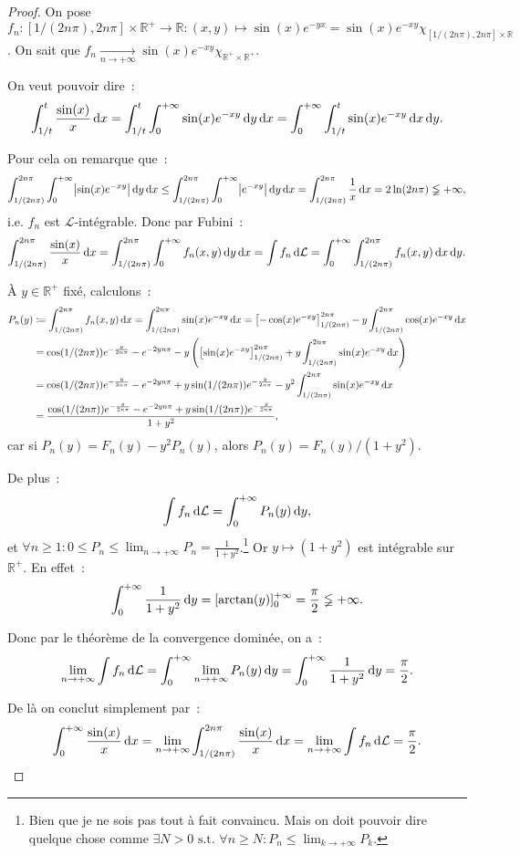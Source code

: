\documentclass{article}
\theoremstyle{definition}
\newcommand{\pinfty}{{+\infty}}
\newcommand{\st}{\text{ s.t. }}
\newcommand{\R}{{\mathbb R}}
\begin{document}
\begin{proof} On pose $f_n : [1/(2n\pi), 2n\pi] \times \R^+ \to \R : (x, y) \mapsto \sin(x)e^{-yx} = \sin(x)e^{-xy}\chi_{[1/(2n\pi), 2n\pi] \times \R}$. On sait que
$f_n \xrightarrow[n \to \pinfty]{} \sin(x)e^{-xy}\chi_{\R^+ \times \R^+}$.

On veut pouvoir dire~:
\[\int_{1/t}^t\frac {\sin(x)}x\dif x = \int_{1/t}^t\int_0^\pinfty\sin(x)e^{-xy}\dif y\dif x = \int_0^\pinfty\int_{1/t}^t\sin(x)e^{-xy}\dif x\dif y.\]

Pour cela on remarque que~:
\[\int_{1/(2n\pi)}^{2n\pi}\int_0^\pinfty\abs {\sin(x)e^{-xy}}\dif y\dif x \leq \int_{1/(2n\pi)}^{2n\pi}\int_0^\pinfty\abs {e^{-xy}}\dif y\dif x
	= \int_{1/(2n\pi)}^{2n\pi}\frac 1x\dif x = 2\ln (2n\pi) \lneqq \pinfty,\]
i.e. $f_n$ est $\mathcal L$-intégrable. Donc par Fubini~:
\[\int_{1/(2n\pi)}^{2n\pi}\frac {\sin(x)}x\dif x = \int_{1/(2n\pi)}^{2n\pi}\int_0^\pinfty f_n(x, y)\dif y\dif x = \int f_n\dif\mathcal L
	= \int_0^\pinfty\int_{1/(2n\pi)}^{2n\pi}f_n(x, y)\dif x\dif y.\]

À $y \in \R^+$ fixé, calculons~:
\begin{align*}
	P_n(y) &\coloneqq \int_{1/(2n\pi)}^{2n\pi}f_n(x, y)\dif x = \int_{1/(2n\pi)}^{2n\pi}\sin(x)e^{-xy}\dif x = \left[-\cos(x)e^{-xy}\right]_{1/(2n\pi)}^{2n\pi} - y\int_{1/(2n\pi)}^{2n\pi}\cos(x)e^{-xy}\dif x \\
	&= \cos(1/(2n\pi))e^{-\frac y{2n\pi}} - e^{-2yn\pi} - y\left(\left[\sin(x)e^{-xy}\right]_{1/(2n\pi)}^{2n\pi} + y\int_{1/(2n\pi)}^{2n\pi}\sin(x)e^{-xy}\dif x\right) \\
	&= \cos(1/(2n\pi))e^{-\frac y{2n\pi}} - e^{-2yn\pi} + y\sin(1/(2n\pi))e^{-\frac y{2n\pi}} - y^2\int_{1/(2n\pi)}^{2n\pi}\sin(x)e^{-xy}\dif x \\
	&= \frac {\cos(1/(2n\pi))e^{-\frac y{2n\pi}} - e^{-2yn\pi} + y\sin(1/(2n\pi))e^{-\frac y{2n\pi}}}{1+y^2},
\end{align*}
car si $P_n(y) = F_n(y) - y^2P_n(y)$, alors $P_n(y) = F_n(y)/(1+y^2)$.

De plus~:
\[\int f_n\dif \mathcal L = \int_0^\pinfty P_n(y)\dif y,\]
et $\forall n \geq 1 : 0 \leq P_n \leq \lim_{n \to \pinfty}P_n = \frac 1{1+y^2}$.\footnote{Bien que je ne sois pas tout à fait convaincu. Mais on doit pouvoir dire quelque chose comme
$\exists N > 0 \st \forall n \geq N : P_n \leq \lim_{k \to \pinfty}P_k$.} Or $y \mapsto (1+y^2)$ est intégrable sur $\R^+$. En effet~:
\[\int_0^\pinfty\frac 1{1+y^2}\dif y = [\arctan(y)]_0^\pinfty = \frac \pi2 \lneqq \pinfty.\]

Donc par le théorème de la convergence dominée, on a~:
\[\lim_{n \to \pinfty}\int f_n\dif\mathcal L = \int_0^\pinfty \lim_{n \to \pinfty}P_n(y)\dif y = \int_0^\pinfty\frac 1{1+y^2}\dif y = \frac \pi2.\]

De là on conclut simplement par~:
\[\int_0^\pinfty \frac {\sin(x)}x\dif x = \lim_{n \to \pinfty}\int_{1/(2n\pi)}^{2n\pi}\frac {\sin(x)}x\dif x = \lim_{n \to \pinfty}\int f_n\dif\mathcal L = \frac \pi2.\]
{\small \color{white}{Voilà qui fut technique~!}}
\end{proof}
\end{document}
